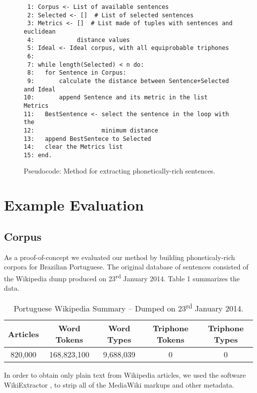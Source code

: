 \begin{figure}
\scriptsize
\caption{Pseudocode: Method for extracting phonetically-rich sentences.}\label{fig:phon-rich-pseudocode}
\begin{lstlisting}
 1: Corpus <- List of available sentences
 2: Selected <- []  # List of selected sentences
 3: Metrics <- []  # List made of tuples with sentences and euclidean 
 4:            distance values
 5: Ideal <- Ideal corpus, with all equiprobable triphones
 6: 
 7: while length(Selected) < n do:
 8:   for Sentence in Corpus:
 9:       calculate the distance between Sentence+Selected and Ideal
10:       append Sentence and its metric in the list Metrics
11:   BestSentence <- select the sentence in the loop with the
12:                   minimum distance
13:   append BestSentece to Selected
14:   clear the Metrics list
15: end.
\end{lstlisting}
\end{figure}


\section{Example Evaluation}
\subsection{Corpus}

As a proof-of-concept we evaluated our method by building phoneticaly-rich corpora for Brazilian Portuguese. The original 
database of sentences consisted of the Wikipedia dump produced on 23\textsuperscript{rd} January 2014.
Table 1 summarizes the data.

\begin{table}[H]
\begin{center}
\begin{tabular}{|c|c|c|c|c|}
\hline \bf Articles & \bf Word Tokens  & \bf Word Types & \bf Triphone Tokens & \bf Triphone Types\\\hline
820,000 & 168,823,100 & 9,688,039 & 0 & 0\\
\hline
\end{tabular}
\end{center}
\caption{\label{wikipedia-summary} Portuguese Wikipedia Summary -- Dumped on 23\textsuperscript{rd} January 2014.}
\end{table}

In order to obtain only plain text from Wikipedia articles, we used the software WikiExtractor \cite{Wikiextractor2013}, to strip 
all of the MediaWiki markups and other metadata. 

